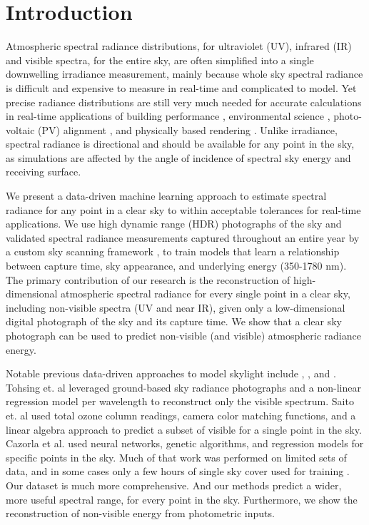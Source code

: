 \section{Introduction}

Atmospheric spectral radiance distributions, for ultraviolet (UV), infrared (IR) and visible spectra, for the entire sky, are often simplified into a single downwelling irradiance measurement, mainly because whole sky spectral radiance is difficult and expensive to measure in real-time and complicated to model. Yet precise radiance distributions are still very much needed for accurate calculations in real-time applications of building performance \citep{hensen_buildingperformance, chandrasekhar_radiative, jakica_survey}, environmental science \citep{lopez-alvarez_using_2008}, photo-voltaic (PV) alignment \citep{smith_tilt}, and physically based rendering \citep{jakob_mitsuba, hosek_model, satylmys_ann}. Unlike irradiance, spectral radiance is directional and should be available for any point in the sky, as simulations are affected by the angle of incidence of spectral sky energy and receiving surface.

We present a data-driven machine learning approach to estimate spectral radiance for any point in a clear sky to within acceptable tolerances for real-time applications. We use high dynamic range (HDR) photographs of the sky and validated spectral radiance measurements captured throughout an entire year by a custom sky scanning framework \citep{kider_framework_2014}, to train models that learn a relationship between capture time, sky appearance, and underlying energy (350-1780 nm). The primary contribution of our research is the reconstruction of high-dimensional atmospheric spectral radiance for every single point in a clear sky, including non-visible spectra (UV and near IR), given only a low-dimensional digital photograph of the sky and its capture time. We show that a clear sky photograph can be used to predict non-visible (and visible) atmospheric radiance energy.

Notable previous data-driven approaches to model skylight include \citet{tohsing_validation_2014}, \citet{saito_estimation_2016}, and \citet{lopez-alvarez_using_2008, cazorla_using_2008, cazorla_development_2008}. Tohsing et. al leveraged ground-based sky radiance photographs and a non-linear regression model per wavelength to reconstruct only the visible spectrum. Saito et. al used total ozone column readings, camera color matching functions, and a linear algebra approach to predict a subset of visible for a single point in the sky. Cazorla et al. used neural networks, genetic algorithms, and regression models for specific points in the sky. Much of that work was performed on limited sets of data, and in some cases only a few hours of single sky cover used for training \citep{tohsing_validation_2014}. Our dataset is much more comprehensive. And our methods predict a wider, more useful spectral range, for every point in the sky. Furthermore, we show the reconstruction of non-visible energy from photometric inputs.

